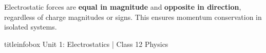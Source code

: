 \begin{frame}
\vspace{0.3cm}

\begin{importantbox}
\vspace{0.05cm}
Electrostatic forces are \textbf{equal in magnitude} and \textbf{opposite in direction}, regardless of charge magnitudes or signs. This ensures momentum conservation in isolated systems.
\vspace{0.05cm}
\end{importantbox}

\vfill

\begin{beamercolorbox}[wd=\textwidth,ht=0.5cm,dp=0.1cm,center]{titleinfobox}
    \small\color{coolgray} Unit 1: Electrostatics | Class 12 Physics
\end{beamercolorbox}
\end{frame}

